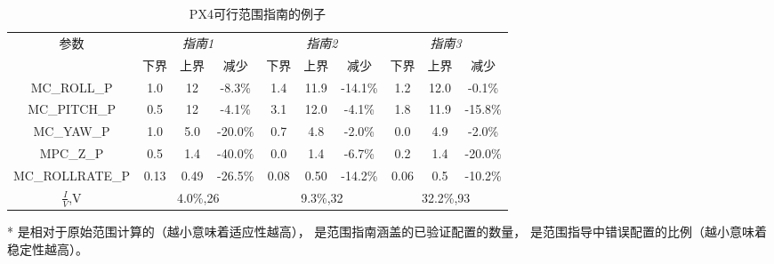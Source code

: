 \begin{table}[ht]
\caption{PX4可行范围指南的例子}
\label{tab:range_shrink_px4}
\centering
\begin{threeparttable}
\begin{tabular}{c|ccc|ccc|ccc}
        \toprule[1.5pt]
          \multirow{2}{*}{参数}  & \multicolumn{3}{c|}{\textit{指南1}} & \multicolumn{3}{c|}{\textit{指南2}} & \multicolumn{3}{c}{\textit{指南3}} \\
         \cmidrule[0.8pt]{2-10}
          ~ & {下界} & {上界} & 减少& {下界} & {上界} & 减少& {下界} & {上界} & 减少 \\
         
        \midrule[0.8pt]
        
         MC\_ROLL\_P  &  1.0 &  12   & -8.3\%   & 1.4 & 11.9   & -14.1\% &  1.2 & 12.0  & -0.1\%\\
        
          MC\_PITCH\_P  &  0.5 &  12   & -4.1\%   & 3.1 & 12.0  & -4.1\% &  1.8 & 11.9  & -15.8\%\\
        
          MC\_YAW\_P &   1.0 &  5.0   & -20.0\%  & 0.7 & 4.8  & -2.0\% &  0.0 & 4.9  & -2.0\%\\
        
          MPC\_Z\_P &   0.5 &  1.4   & -40.0\%  & 0.0 & 1.4  & -6.7\% &  0.2 & 1.4  & -20.0\%\\
        
          MC\_ROLLRATE\_P &   0.13 &  0.49   & -26.5\%  & 0.08 & 0.50  & -14.2\% &  0.06 & 0.5  & -10.2\%\\
    
        
        \midrule[0.8pt]
        {$\frac{I}{V}$},{V} & 
        \multicolumn{3}{c|}{4.0\%,26} & 
         \multicolumn{3}{c|}{9.3\%,32} & 
         \multicolumn{3}{c}{32.2\%,93} \\
        
        \bottomrule[1.5pt]
\end{tabular}
\begin{tablenotes}
\footnotesize
\item[*] 
是相对于原始范围计算的（越小意味着适应性越高），
 是范围指南涵盖的已验证配置的数量，
 是范围指导中错误配置的比例（越小意味着稳定性越高）。
\end{tablenotes}
\end{threeparttable}
\end{table}
